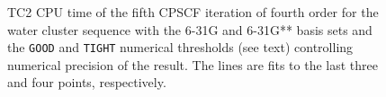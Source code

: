 \documentclass[prl,aps,preprint,showpacs,superbib]{revtex4}
\begin{document}
{\begin{figure}[h]
  \caption{\protect
    TC2 CPU time of the fifth CPSCF iteration of fourth order for
    the water cluster sequence with the 6-31G and 6-31G** 
    basis sets and the {\tt GOOD} and {\tt TIGHT} 
    numerical thresholds (see text) controlling numerical
    precision of the result. The lines are fits to the 
    last three and four points, respectively.
  }\label{fig:Gamma_TC2R_Timing}
\end{figure}

}
\end{document}

